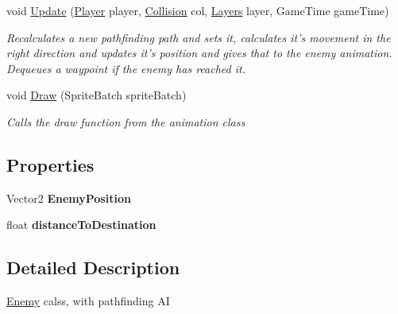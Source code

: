 \begin{DoxyCompactItemize}
void \hyperlink{class_pacman_1_1_enemy_ae18c341fda06015c85cf1ce112bdc62b}{Update} (\hyperlink{class_pacman_1_1_player}{Player} player, \hyperlink{class_pacman_1_1_collision}{Collision} col, \hyperlink{class_pacman_1_1_layers}{Layers} layer, Game\-Time game\-Time)
\begin{DoxyCompactList}\small\item\em Recalculates a new pathfinding path and sets it, calculates it's movement in the right direction and updates it's position and gives that to the enemy animation. Dequeues a waypoint if the enemy has reached it. \end{DoxyCompactList}\item 
void \hyperlink{class_pacman_1_1_enemy_ae30d7de2c9966fd540ca8ab92f36c7dc}{Draw} (Sprite\-Batch sprite\-Batch)
\begin{DoxyCompactList}\small\item\em Calls the draw function from the animation class \end{DoxyCompactList}\end{DoxyCompactItemize}
\subsection*{Properties}
\begin{DoxyCompactItemize}
\item 
\hypertarget{class_pacman_1_1_enemy_ab7bc744525f9eebd36900fdeada135bb}{Vector2 {\bfseries Enemy\-Position}}\label{class_pacman_1_1_enemy_ab7bc744525f9eebd36900fdeada135bb}

\item 
\hypertarget{class_pacman_1_1_enemy_a2263aadbd1d78ead404e84f41bada49b}{float {\bfseries distance\-To\-Destination}}\label{class_pacman_1_1_enemy_a2263aadbd1d78ead404e84f41bada49b}

\end{DoxyCompactItemize}


\subsection{Detailed Description}
\hyperlink{class_pacman_1_1_enemy}{Enemy} calss, with pathfinding A\-I 



